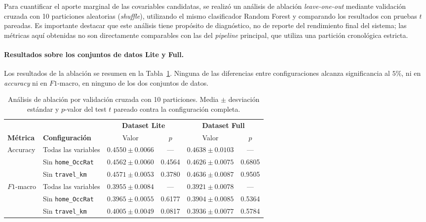 Para cuantificar el aporte marginal de las covariables candidatas, se realiz\'o un an\'alisis de ablaci\'on \emph{leave-one-out} mediante validaci\'on cruzada con 10 particiones aleatorias (\emph{shuffle}), utilizando el mismo clasificador Random Forest y comparando los resultados con pruebas $t$ pareadas. Es importante destacar que este an\'alisis tiene prop\'osito de diagn\'ostico, no de reporte del rendimiento final del sistema; las m\'etricas aqu\'i obtenidas no son directamente comparables con las del \textit{pipeline} principal, que utiliza una partici\'on cronol\'ogica estricta.

\paragraph{Resultados sobre los conjuntos de datos Lite y Full.} Los 
resultados de la ablaci\'on se resumen en la 
Tabla~\ref{tab:ablacion}. Ninguna de las diferencias entre configuraciones alcanza significancia al $5\%$, ni en \emph{accuracy} ni en $F1$-macro, en ninguno de los dos conjuntos de datos.

\begin{table}[htbp]
	\centering
	\caption{An\'alisis de ablaci\'on por validaci\'on cruzada con 
		10 particiones. Media $\pm$ desviaci\'on est\'andar y 
		$p$-valor del test $t$ pareado contra la configuraci\'on 
		completa.}
	\label{tab:ablacion}
	\small
	\begin{tabular}{llcccc}
		\toprule
		& & \multicolumn{2}{c}{\textbf{Dataset Lite}} & 
		\multicolumn{2}{c}{\textbf{Dataset Full}} \\
		\cmidrule(lr){3-4} \cmidrule(lr){5-6}
		\textbf{M\'etrica} & \textbf{Configuraci\'on} & 
		Valor & $p$ & Valor & $p$ \\
		\midrule
		\multirow{3}{*}{Accuracy}
		& Todas las variables          & $0.4550 \pm 0.0066$ & ---     & $0.4638 \pm 0.0103$ & --- \\
		& Sin \texttt{home\_OccRat}    & $0.4562 \pm 0.0060$ & 0.4564  & $0.4626 \pm 0.0075$ & 0.6805 \\
		& Sin \texttt{travel\_km}      & $0.4571 \pm 0.0053$ & 0.3780  & $0.4636 \pm 0.0087$ & 0.9505 \\
		\midrule
		\multirow{3}{*}{$F1$-macro}
		& Todas las variables          & $0.3955 \pm 0.0084$ & ---     & $0.3921 \pm 0.0078$ & --- \\
		& Sin \texttt{home\_OccRat}    & $0.3965 \pm 0.0055$ & 0.6177  & $0.3904 \pm 0.0085$ & 0.5364 \\
		& Sin \texttt{travel\_km}      & $0.4005 \pm 0.0049$ & 0.0817  & $0.3936 \pm 0.0077$ & 0.5784 \\
		\bottomrule
	\end{tabular}
\end{table}

